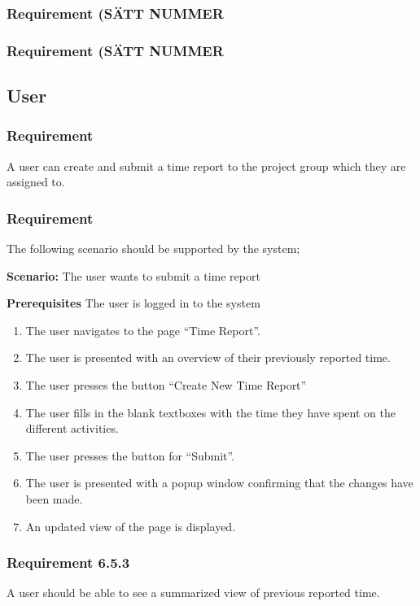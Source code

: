 \documentclass{article}
\begin{document}
\subsubsection{Requirement (SÄTT NUMMER}
\subsubsection{Requirement (SÄTT NUMMER} 

\subsection{User}
\subsubsection{Requirement}
A user can create and submit a time report to the project group which they are assigned to.
\subsubsection{Requirement}
The following scenario should be supported by the system;

\textbf{Scenario:} The user wants to submit a time report

\textbf{Prerequisites} The user is logged in to the system

\begin{enumerate}


\item The user navigates to the page “Time Report”. 
\item The user is presented with an overview of their previously reported time. 
\item The user presses the button “Create New Time Report”
\item The user fills in the blank textboxes with the time they have spent on the different activities.
\item The user presses the button for “Submit”.
\item The user is presented with a popup window confirming that the changes have been made.
\item An updated view of the page is displayed.
\end{enumerate}

\subsubsection{Requirement 6.5.3}
A user should be able to see a summarized view of previous reported time.
\end{document}
